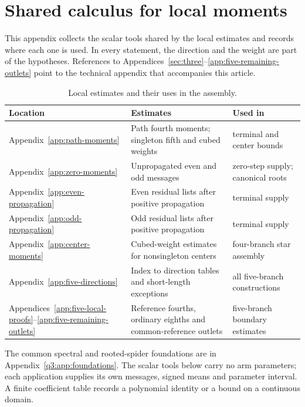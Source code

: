 \section{Shared calculus for local moments}\label{app:local-calculus}\label{app:catalogue-map}\label{app:local-catalogue}
This appendix collects the scalar tools shared by the local estimates and
records where each one is used. In every statement, the direction and the
weight are part of the hypotheses. References to Appendices~\ref{sec:three}--\ref{app:five-remaining-outlets} point to
the technical appendix that accompanies this article.
\begin{table}[htbp]
\centering
\caption{Local estimates and their uses in the assembly.}\label{tab:proof-index}

\begin{tabular}{@{}p{30mm}p{74mm}p{43mm}@{}}\toprule
Location & Estimates & Used in\\\midrule
Appendix~\ref{app:path-moments} & Path fourth moments; singleton fifth and cubed weights & terminal and center bounds\\
Appendix~\ref{app:zero-moments} & Unpropagated even and odd messages & zero-step supply; canonical roots\\
Appendix~\ref{app:even-propagation} & Even residual lists after positive propagation & terminal supply\\
Appendix~\ref{app:odd-propagation} & Odd residual lists after positive propagation & terminal supply\\
Appendix~\ref{app:center-moments} & Cubed-weight estimates for nonsingleton centers & four-branch star assembly\\
Appendix~\ref{app:five-directions} & Index to direction tables and short-length exceptions & all five-branch constructions\\
Appendices~\ref{app:five-local-proofs}--\ref{app:five-remaining-outlets} & Reference fourths, ordinary eighths and common-reference outlets & five-branch boundary estimates\\\bottomrule
\end{tabular}

\end{table}
The common spectral and rooted-spider foundations are in
Appendix~\ref{q3:app:foundations}.\label{loc:S1}
The scalar tools below carry no arm parameters; each application supplies
its own messages, signed means and parameter interval. A finite
coefficient table records a polynomial identity or a bound on a
continuous domain.

